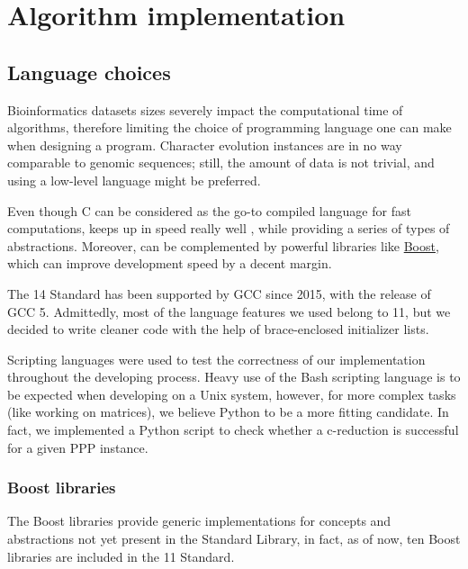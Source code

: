 
\section{Algorithm implementation}\label{section:implementation}


\subsection{Language choices}\label{section:language-choices}

Bioinformatics datasets sizes severely impact the computational time of algorithms, therefore limiting the choice of programming language one can make when designing a program.
Character evolution instances are in no way comparable to genomic sequences; still, the amount of data is not trivial, and using a low-level language might be preferred.

Even though C can be considered as the go-to compiled language for fast computations, \cc{} keeps up in speed really well \cite{PLB2008}, while providing a series of types of abstractions.
Moreover, \cc{} can be complemented by powerful libraries like \href{http://www.boost.org/}{Boost}, which can improve development speed by a decent margin.

The \cc{}14 Standard has been supported by GCC since 2015, with the release of GCC 5.
Admittedly, most of the language features we used belong to \cc{}11, but we decided to write cleaner code with the help of brace-enclosed initializer lists.

Scripting languages were used to test the correctness of our implementation throughout the developing process.
Heavy use of the Bash scripting language is to be expected when developing on a Unix system, however, for more complex tasks (like working on matrices), we believe Python to be a more fitting candidate.
In fact, we implemented a Python script to check whether a c-reduction is successful for a given PPP instance.


\subsubsection{Boost libraries}\label{section:boost-libs}

The Boost libraries provide generic implementations for concepts and abstractions not yet present in the Standard Library, in fact, as of now, ten Boost libraries are included in the \cc{}11 Standard.

